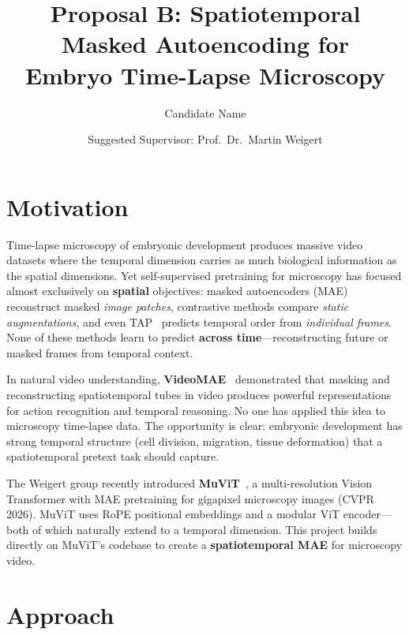 \documentclass{article}
\title{Proposal B: Spatiotemporal Masked Autoencoding for\\Embryo Time-Lapse Microscopy}
\author{Candidate Name}
\date{Suggested Supervisor: Prof.\ Dr.\ Martin Weigert}
\begin{document}
\maketitle

\section*{Motivation}

Time-lapse microscopy of embryonic development produces massive video datasets where the temporal dimension carries as much biological information as the spatial dimensions. Yet self-supervised pretraining for microscopy has focused almost exclusively on \textbf{spatial} objectives: masked autoencoders (MAE) reconstruct masked \emph{image patches}, contrastive methods compare \emph{static augmentations}, and even TAP~\cite{tap} predicts temporal order from \emph{individual frames}. None of these methods learn to predict \textbf{across time}---reconstructing future or masked frames from temporal context.

In natural video understanding, \textbf{VideoMAE}~\cite{videomae} demonstrated that masking and reconstructing spatiotemporal tubes in video produces powerful representations for action recognition and temporal reasoning. No one has applied this idea to microscopy time-lapse data. The opportunity is clear: embryonic development has strong temporal structure (cell division, migration, tissue deformation) that a spatiotemporal pretext task should capture.

The Weigert group recently introduced \textbf{MuViT}~\cite{muvit}, a multi-resolution Vision Transformer with MAE pretraining for gigapixel microscopy images (CVPR 2026). MuViT uses RoPE positional embeddings and a modular ViT encoder---both of which naturally extend to a temporal dimension. This project builds directly on MuViT's codebase to create a \textbf{spatiotemporal MAE} for microscopy video.

\section*{Approach}
\end{document}
